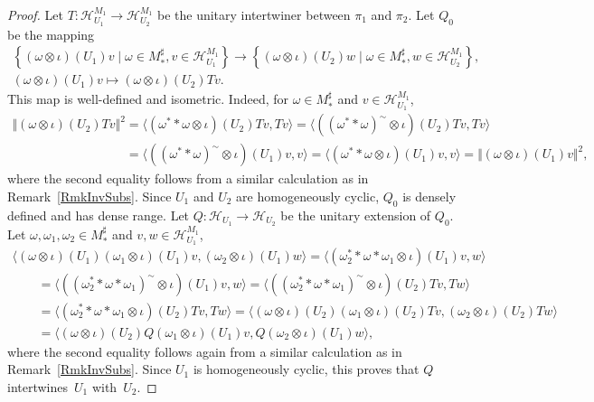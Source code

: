 \documentclass[11pt]{article}
\numberwithin{equation}{section}
\theoremstyle{definition}
\newcommand{\cHil}{\mathcal{H}}
\begin{document}
\begin{proof}
Let $T: \cHil_{U_1}^{M_1} \rightarrow \cHil_{U_2}^{M_1} $ be the unitary intertwiner between $\pi_1$ and $\pi_2$. Let $Q_0$ be the mapping
\begin{gather*}
 \left\{ (\omega \otimes \iota)(U_1) v \mid \omega \in M_\ast^\sharp, v \in \cHil_{U_1}^{M_1} \right\}  \rightarrow
 \left\{ (\omega \otimes \iota)(U_2) w \mid \omega \in M_\ast^\sharp, w \in \cHil_{U_2}^{M_1} \right\}, \\
(\omega \otimes \iota)(U_1) v   \mapsto (\omega \otimes \iota)(U_2) T v.
\end{gather*}
This map is well-def\/ined and isometric. Indeed, for $\omega \in M_\ast^\sharp$ and $v \in \cHil_{U_1}^{M_1}$,
\begin{gather*}
  \Vert (\omega \otimes \iota)(U_2) T v \Vert^2 = \langle (\omega^\ast \ast \omega \otimes \iota)(U_2) T v, T v \rangle =
 \langle( (\omega^\ast \ast \omega )^\sim \otimes \iota)(U_2) T v, T v \rangle \\
 \phantom{\Vert (\omega \otimes \iota)(U_2) T v \Vert^2}{}  =
\langle( (\omega^\ast \ast \omega )^\sim\otimes \iota)(U_1)  v,  v \rangle =
 \langle (\omega^\ast \ast \omega \otimes \iota)(U_1)  v,  v \rangle =
 \Vert (\omega \otimes \iota)(U_1) v \Vert^2,
\end{gather*}
where the second equality follows from a similar calculation as in Remark~\ref{RmkInvSubs}.
Since $U_1$ and $U_2$ are homogeneously cyclic, $Q_0$ is densely def\/ined and has dense range. Let $Q: \cHil_{U_1} \rightarrow \cHil_{U_2}$ be the unitary extension of $Q_0$.  Let $\omega, \omega_1, \omega_2 \in M_\ast^\sharp$ and $v, w \in \cHil_{U_1}^{M_1}$,
\begin{gather*}
  \langle (\omega \otimes \iota)(U_1) (\omega_1 \otimes \iota)(U_1) v, (\omega_2 \otimes \iota)(U_1) w \rangle =
 \langle (\omega_2^\ast \ast \omega \ast \omega_1 \otimes \iota)(U_1)  v, w \rangle  \\
\qquad{}=  \langle ( (\omega_2^\ast \ast \omega \ast \omega_1)^\sim \otimes \iota)(U_1)  v, w \rangle =
 \langle ( (\omega_2^\ast \ast \omega \ast \omega_1)^\sim \otimes \iota)(U_2) T  v,  T w \rangle  \\
\qquad {} = \langle (\omega_2^\ast \ast \omega \ast \omega_1 \otimes \iota)(U_2) T  v,  T w \rangle =
\langle (\omega \otimes \iota)(U_2) (\omega_1 \otimes \iota)(U_2) T v, (\omega_2 \otimes \iota)(U_2) T w \rangle  \\
\qquad {}= \langle (\omega \otimes \iota)(U_2) Q (\omega_1 \otimes \iota)(U_1)  v, Q (\omega_2 \otimes \iota)(U_1)  w \rangle,
\end{gather*}
where the second equality follows again from a similar calculation as in Remark~\ref{RmkInvSubs}.
Since $U_1$ is homogeneously cyclic, this proves that $Q$ intertwines~$U_1$ with~$U_2$.
\end{proof}
\end{document}
